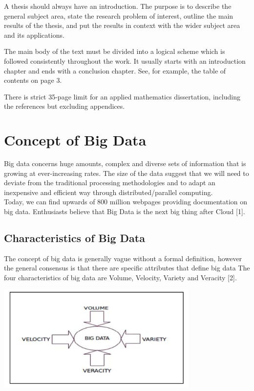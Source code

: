 \documentclass[11pt]{book}
\begin{document}
A thesis should always have an introduction.  The purpose is to describe the general subject area, state the research problem of interest, outline the main results of the thesis, and put the results in context with the wider subject area and its applications.

The main body of the text must be divided into a logical scheme which  is followed consistently throughout the work.  
 It usually starts with an introduction chapter  and ends with  a conclusion chapter. See, for example, the table of contents on page 3. 

There is strict  35-page limit  for an applied mathematics dissertation,  including  the references  but excluding  appendices. 

\section{Concept of Big Data}

Big data concerns huge amounts, complex and diverse sets of information that is growing at ever-increasing rates. The size of the data suggest that we will need to deviate from the traditional processing methodologies and to adapt an inexpensive and efficient way through distributed/parallel computing.\\

Today, we can find upwards of 800 million webpages providing documentation on big data. Enthusiasts believe that Big Data is the next big thing after Cloud [1]. 

\subsection{Characteristics of Big Data}

The concept of big data is generally vague without a formal definition, however the general consensus is that there are specific attributes that define big data The four characteristics of big data are Volume, Velocity, Variety and Veracity [2]. 

\begin{center}
\includegraphics[width=10cm]{4vbd}\\
\end{center}
\end{document}
